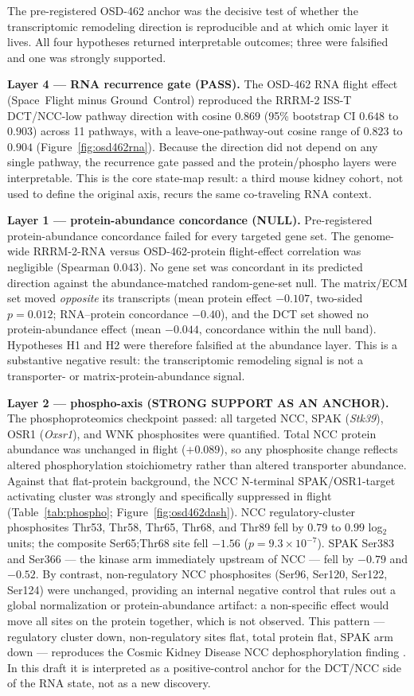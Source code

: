 \documentclass[11pt]{article}
\newcommand{\gene}[1]{\textit{#1}}
\begin{document}
The pre-registered OSD-462 anchor was the decisive test of whether the transcriptomic remodeling direction is reproducible and at which omic layer it lives. All four hypotheses returned interpretable outcomes; three were falsified and one was strongly supported.

\textbf{Layer 4 --- RNA recurrence gate (PASS).} The OSD-462 RNA flight effect (Space~Flight minus Ground~Control) reproduced the RRRM-2 ISS-T DCT/NCC-low pathway direction with cosine $0.869$ (95\% bootstrap CI $0.648$ to $0.903$) across 11 pathways, with a leave-one-pathway-out cosine range of $0.823$ to $0.904$ (Figure~\ref{fig:osd462rna}). Because the direction did not depend on any single pathway, the recurrence gate passed and the protein/phospho layers were interpretable. This is the core state-map result: a third mouse kidney cohort, not used to define the original axis, recurs the same co-traveling RNA context.

\textbf{Layer 1 --- protein-abundance concordance (NULL).} Pre-registered protein-abundance concordance failed for every targeted gene set. The genome-wide RRRM-2-RNA versus OSD-462-protein flight-effect correlation was negligible (Spearman $0.043$). No gene set was concordant in its predicted direction against the abundance-matched random-gene-set null. The matrix/ECM set moved \emph{opposite} its transcripts (mean protein effect $-0.107$, two-sided $p=0.012$; RNA--protein concordance $-0.40$), and the DCT set showed no protein-abundance effect (mean $-0.044$, concordance within the null band). Hypotheses H1 and H2 were therefore falsified at the abundance layer. This is a substantive negative result: the transcriptomic remodeling signal is not a transporter- or matrix-protein-abundance signal.

\textbf{Layer 2 --- phospho-axis (STRONG SUPPORT AS AN ANCHOR).} The phosphoproteomics checkpoint passed: all targeted NCC, SPAK (\gene{Stk39}), OSR1 (\gene{Oxsr1}), and WNK phosphosites were quantified. Total NCC protein abundance was unchanged in flight ($+0.089$), so any phosphosite change reflects altered phosphorylation stoichiometry rather than altered transporter abundance. Against that flat-protein background, the NCC N-terminal SPAK/OSR1-target activating cluster was strongly and specifically suppressed in flight (Table~\ref{tab:phospho}; Figure~\ref{fig:osd462dash}). NCC regulatory-cluster phosphosites Thr53, Thr58, Thr65, Thr68, and Thr89 fell by $0.79$ to $0.99$ log$_2$ units; the composite Ser65;Thr68 site fell $-1.56$ ($p=9.3\times10^{-7}$). SPAK Ser383 and Ser366 --- the kinase arm immediately upstream of NCC --- fell by $-0.79$ and $-0.52$. By contrast, non-regulatory NCC phosphosites (Ser96, Ser120, Ser122, Ser124) were unchanged, providing an internal negative control that rules out a global normalization or protein-abundance artifact: a non-specific effect would move all sites on the protein together, which is not observed. This pattern --- regulatory cluster down, non-regulatory sites flat, total protein flat, SPAK arm down --- reproduces the Cosmic Kidney Disease NCC dephosphorylation finding \citep{siew2024cosmic}. In this draft it is interpreted as a positive-control anchor for the DCT/NCC side of the RNA state, not as a new discovery.
\end{document}
